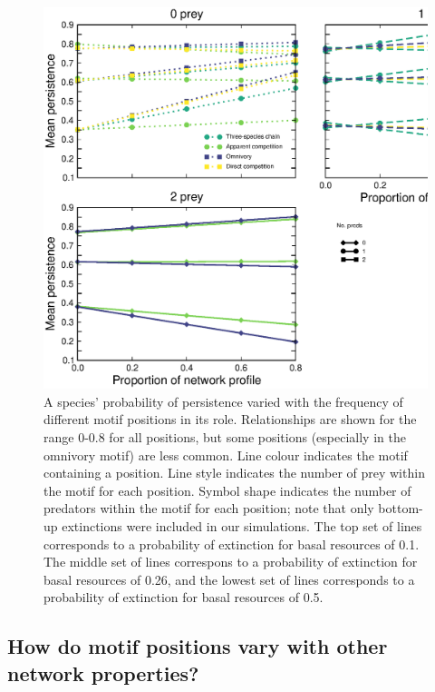 \documentclass[12pt]{article}
\begin{document}
\begin{spacing}{2.0}
        
        \begin{figure}
            \centering
            \includegraphics[width=.95\textwidth]{figures/persistence_positions_byprey.eps}
            \caption{A species' probability of persistence varied with the frequency of different motif positions in its role. Relationships are shown for the range 0-0.8 for all positions, but some positions (especially in the omnivory motif) are less common. Line colour indicates the motif containing a position. Line style indicates the number of prey within the motif for each position. Symbol shape indicates the number of predators within the motif for each position; note that only bottom-up extinctions were included in our simulations. The top set of lines corresponds to a probability of extinction for basal resources of 0.1. The middle set of lines correspons to a probability of extinction for basal resources of 0.26, and the lowest set of lines corresponds to a probability of extinction for basal resources of 0.5.}
            \label{fig:persistence_positions_prey}
        \end{figure}
        
        
    \subsection*{How do motif positions vary with other network properties?}    
    

\end{spacing}
\end{document}
